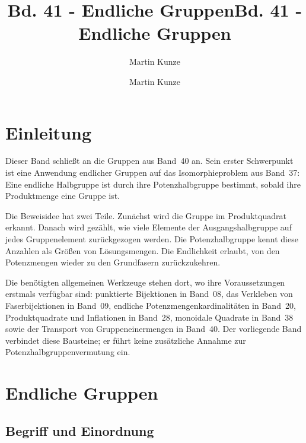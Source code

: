 \documentclass[main.tex]{subfiles}
\title{Bd. 41 - Endliche Gruppen}
\author{Martin Kunze}
\date{}
\begin{document}
\title{Bd. 41 - Endliche Gruppen}
\author{Martin Kunze}
\date{}
\hypersetup{pageanchor=false}
\maketitle
\hypersetup{pageanchor=true}
\setcounter{tocdepth}{3}
\tableofcontents
\setcounter{file}{41}
\renewcommand{\FormulaBandID}{41}

\chapter{Einleitung}

Dieser Band schließt an die Gruppen aus Band~40 an. Sein erster Schwerpunkt
ist eine Anwendung endlicher Gruppen auf das Isomorphieproblem aus Band~37:
Eine endliche Halbgruppe ist durch ihre Potenzhalbgruppe bestimmt, sobald
ihre Produktmenge eine Gruppe ist.

Die Beweisidee hat zwei Teile. Zunächst wird die Gruppe im Produktquadrat
erkannt. Danach wird gezählt, wie viele Elemente der Ausgangshalbgruppe auf
jedes Gruppenelement zurückgezogen werden. Die Potenzhalbgruppe kennt diese
Anzahlen als Größen von Lösungsmengen. Die Endlichkeit erlaubt, von den
Potenzmengen wieder zu den Grundfasern zurückzukehren.

Die benötigten allgemeinen Werkzeuge stehen dort, wo ihre Voraussetzungen
erstmals verfügbar sind: punktierte Bijektionen in Band~08, das Verkleben
von Faserbijektionen in Band~09, endliche Potenzmengenkardinalitäten in
Band~20, Produktquadrate und Inflationen in Band~28, monoidale Quadrate in
Band~38 sowie der Transport von Gruppeneinermengen in Band~40.
Der vorliegende Band verbindet diese Bausteine; er führt keine zusätzliche
Annahme zur Potenzhalbgruppenvermutung ein.

\chapter{Endliche Gruppen}

\section{Begriff und Einordnung}

\end{document}

